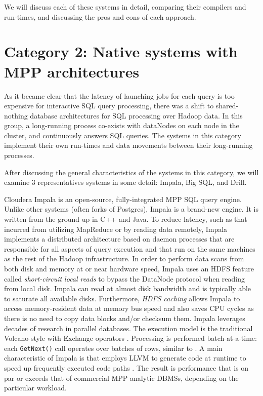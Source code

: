\documentclass{vldb}
\begin{document}
We will discuss each of these systems in detail, comparing their compilers and run-times, and discussing the pros and cons of each approach.


\section{Category 2: Native systems with MPP architectures}

As it became clear that the latency of launching jobs for each query is too expensive for interactive SQL query processing, there was a shift to shared-nothing database architectures for SQL processing over Hadoop data. In this group, a long-running process co-exists with dataNodes on each node in the cluster, and continuously answers SQL queries. The systems in this category implement their own run-times and data movements between their long-running processes. 

After discussing the general characteristics of the systems in this category, we will examine 3 representatives systems in some detail: Impala, Big SQL, and Drill. 

Cloudera Impala \cite{Kornacker+15} is an open-source, fully-integrated MPP SQL query engine. Unlike other systems (often forks of Postgres), Impala is a brand-new engine. It is written from the ground up in C++ and Java. To reduce latency, such as that incurred from utilizing MapReduce or by reading data remotely, Impala implements a distributed architecture based on daemon processes that are responsible for all aspects of query execution and that run on the same machines as the rest of the Hadoop infrastructure. 
In order to perform data scans from both disk and memory at or near hardware speed,
Impala uses an HDFS feature called {\em short-circuit local reads} \cite{hdfs:shortcircuit} to bypass the DataNode protocol when reading from local disk. Impala can read at almost disk bandwidth and is typically able to saturate all available disks. Furthermore, {\em HDFS caching} \cite{hdfs:caching} allows Impala to access memory-resident data at memory bus speed and also saves CPU cycles as there is no need to copy data blocks and/or checksum them.
Impala leverages decades of research in parallel databases. The execution model is the traditional
Volcano-style with Exchange operators \cite{Graefe90}. Processing is performed batch-at-a-time:
each \texttt{GetNext()} call operates over batches of rows, similar to
\cite{PadmanabhanMAJ01}. A main characteristic of Impala is that employs LLVM to generate code at runtime to speed up frequently executed code paths \cite{WandermanL14}. The result is performance that is on par or exceeds that of commercial MPP analytic DBMSs, depending on the particular workload.
\end{document}

